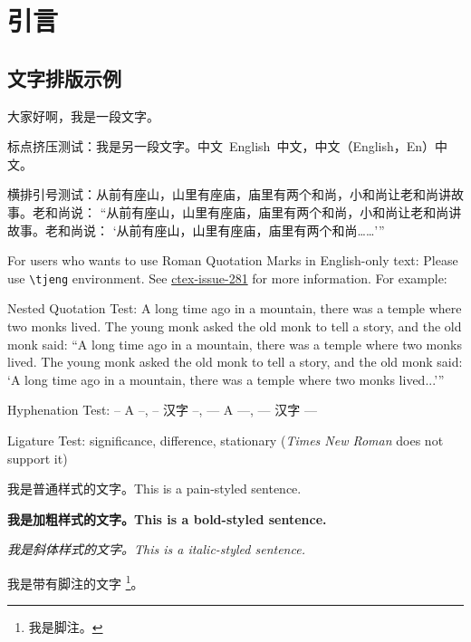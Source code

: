 \chapter{引言}
\label{chap:intro}

\section{文字排版示例}
\label{sec:intro:typesetting}
大家好啊，我是一段文字。

标点挤压测试：我是另一段文字。中文~English~中文，中文（English，En）中文。

横排引号测试：从前有座山，山里有座庙，庙里有两个和尚，小和尚让老和尚讲故事。老和尚说：
“从前有座山，山里有座庙，庙里有两个和尚，小和尚让老和尚讲故事。老和尚说：
‘从前有座山，山里有座庙，庙里有两个和尚……’”

For users who wants to use Roman Quotation Marks in English-only text:
Please use \verb|\tjeng| environment.
See \href{https://github.com/CTeX-org/ctex-kit/issues/389}{ctex-issue-281} for more information.
For example:

\begin{tjeng}
    Nested Quotation Test: A long time ago in a mountain, there was a temple where two monks lived.
    The young monk asked the old monk to tell a story, and the old monk said:
    “A long time ago in a mountain, there was a temple where two monks lived.
    The young monk asked the old monk to tell a story, and the old monk said:
    ‘A long time ago in a mountain, there was a temple where two monks lived...’”
\end{tjeng}

Hyphenation Test: -- A --, -- 汉字 --, --- A ---, --- 汉字 ---

Ligature Test: significance, difference, stationary (\textit{Times New Roman} does not support it)

我是普通样式的文字。This is a pain-styled sentence.

\textbf{我是加粗样式的文字。This is a bold-styled sentence.}

\textit{我是斜体样式的文字。This is a italic-styled sentence.}

我是带有脚注的文字 \footnote{我是脚注。}。

